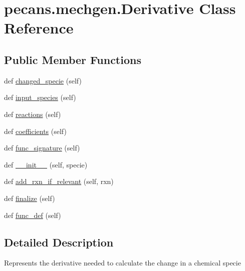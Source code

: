 \hypertarget{classpecans_1_1mechgen_1_1Derivative}{}\section{pecans.\+mechgen.\+Derivative Class Reference}
\label{classpecans_1_1mechgen_1_1Derivative}
\subsection*{Public Member Functions}
\begin{DoxyCompactItemize}
\item 
def \hyperlink{classpecans_1_1mechgen_1_1Derivative_a8e0a1ede8e4d02582dda60aa2738c4b7}{changed\+\_\+specie} (self)
\item 
def \hyperlink{classpecans_1_1mechgen_1_1Derivative_a262ef84f18366212ccfd65bf55e32e3f}{input\+\_\+species} (self)
\item 
def \hyperlink{classpecans_1_1mechgen_1_1Derivative_a1b27d7f388e6e23424d26131111d8eca}{reactions} (self)
\item 
def \hyperlink{classpecans_1_1mechgen_1_1Derivative_ad5d2c9c575a5f73dd1e8df55bde0b149}{coefficients} (self)
\item 
def \hyperlink{classpecans_1_1mechgen_1_1Derivative_a8e5fea94add3ea7b89af843e46a10f0d}{func\+\_\+signature} (self)
\item 
def \hyperlink{classpecans_1_1mechgen_1_1Derivative_aa36d38bcd95cd1788751b2c126ad54eb}{\+\_\+\+\_\+init\+\_\+\+\_\+} (self, specie)
\item 
def \hyperlink{classpecans_1_1mechgen_1_1Derivative_afd45c9243d14a3411bf0cd520eed89e8}{add\+\_\+rxn\+\_\+if\+\_\+relevant} (self, rxn)
\item 
def \hyperlink{classpecans_1_1mechgen_1_1Derivative_adde4d44f33a22c4785c1c1c989a06251}{finalize} (self)
\item 
def \hyperlink{classpecans_1_1mechgen_1_1Derivative_a68bc05227b54ff11d80ee283ee5895ba}{func\+\_\+def} (self)
\end{DoxyCompactItemize}


\subsection{Detailed Description}
\begin{DoxyVerb}Represents the derivative needed to calculate the change in a chemical specie
\end{DoxyVerb}
 

